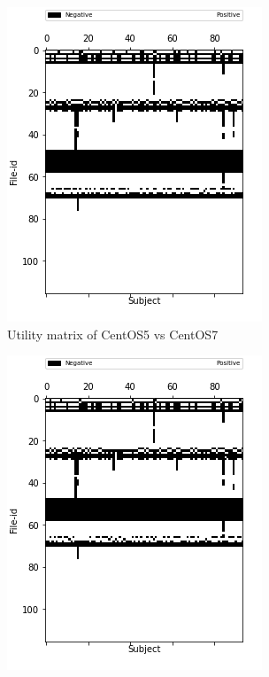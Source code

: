 \documentclass[10pt, conference, compsocconf]{IEEEtran}
\begin{document}
\begin{figure}
\begin{subfigure}[b]{0.5\linewidth}
	 \includegraphics[width=\columnwidth]{figures/utility_5vs7_PFS}
  \caption{Utility matrix of CentOS5 vs CentOS7}
  \end{subfigure}
  \begin{subfigure}[b]{0.5\linewidth}
	\includegraphics[width=\columnwidth]{figures/utility_6vs7_PFS}

\end{subfigure}
\end{figure}
\end{document}
